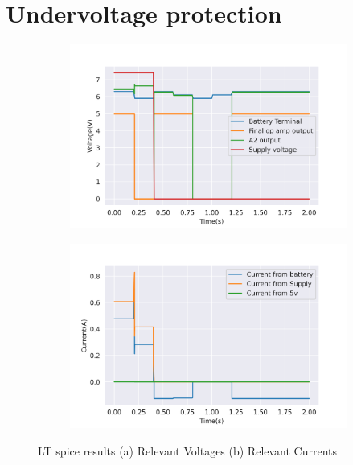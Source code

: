 \section{Undervoltage protection}
\begin{figure}[!htb]
 \footnotesize
 \centering
    \begin{subfigure}[]{0.45\textwidth}
              \centering
  		\includegraphics[width=1\linewidth]{./Figures/A31.png}
		    \caption{} \label{subfig:voltage}
     \end{subfigure}
     \begin{subfigure}[]{0.45\textwidth}
             \centering
  		\includegraphics[width=1\linewidth]{./Figures/A32.png}
		   \caption{ } \label{subfig:current}
     \end{subfigure}
   \caption[{LT spice Results}]{LT spice results   (a) Relevant Voltages (b)  Relevant Currents }
    \label{fig:lt}
 \end{figure}


